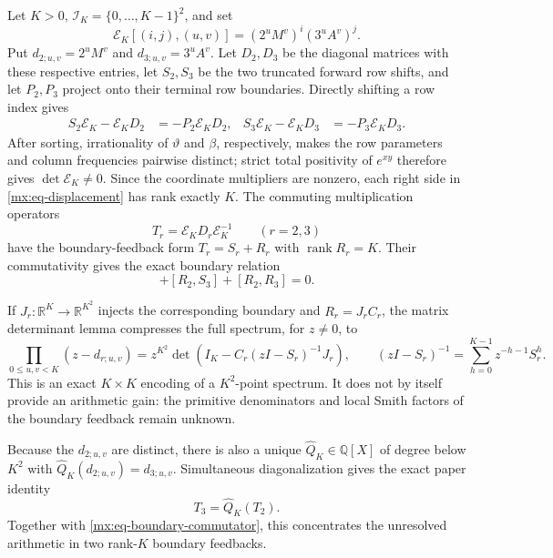 \documentclass[11pt,oneside]{article}
\theoremstyle{definition}
\theoremstyle{remark}
\newcommand{\Q}{\mathbb Q}
\newcommand{\R}{\mathbb R}
\newcommand{\thetaq}{\vartheta}
\begin{document}
Let $K>0$, $\mathcal I_K=\{0,\ldots,K-1\}^2$, and set
\begin{equation}
 \mathcal E_K[(i,j),(u,v)]
 =(2^uM^v)^i(3^uA^v)^j.
 \label{mx:eq-grid-matrix}
\end{equation}
Put $d_{2;u,v}=2^uM^v$ and $d_{3;u,v}=3^uA^v$.  Let $D_2,D_3$ be the diagonal matrices
with these respective entries, let
$S_2,S_3$ be the two truncated forward row shifts, and let $P_2,P_3$ project onto their
terminal row boundaries.  Directly shifting a row index gives
\begin{align}
 S_2\mathcal E_K-\mathcal E_KD_2&=-P_2\mathcal E_KD_2,
 &S_3\mathcal E_K-\mathcal E_KD_3&=-P_3\mathcal E_KD_3.
 \label{mx:eq-displacement}
\end{align}
After sorting, irrationality of $\thetaq$ and $\beta$, respectively, makes the row parameters
and column frequencies pairwise distinct; strict total positivity of $e^{xy}$ therefore gives
$\det\mathcal E_K\ne0$.  Since the coordinate multipliers are nonzero, each right side in
\eqref{mx:eq-displacement} has rank exactly $K$.  The commuting
multiplication operators
\[
 T_r=\mathcal E_KD_r\mathcal E_K^{-1}\qquad(r=2,3)
\]
have the boundary-feedback form $T_r=S_r+R_r$ with $\operatorname{rank}R_r=K$.  Their commutativity gives
the exact boundary relation
\begin{equation}
 [S_2,R_3]+[R_2,S_3]+[R_2,R_3]=0.
 \label{mx:eq-boundary-commutator}
\end{equation}

If $J_r:\R^K\to\R^{K^2}$ injects the corresponding boundary and $R_r=J_rC_r$, the matrix
determinant lemma compresses the full spectrum, for $z\ne0$, to
\begin{equation}
 \prod_{0\le u,v<K}(z-d_{r;u,v})
 =z^{K^2}\det\!\left(I_K-C_r(zI-S_r)^{-1}J_r\right),
 \qquad
 (zI-S_r)^{-1}=\sum_{h=0}^{K-1}z^{-h-1}S_r^h.
 \label{mx:eq-transfer-determinant}
\end{equation}
This is an exact $K\times K$ encoding of a $K^2$-point spectrum.  It does not by itself
provide an arithmetic gain: the primitive denominators and local Smith factors of the
boundary feedback remain unknown.

Because the $d_{2;u,v}$ are distinct, there is also a unique
$\widehat Q_K\in\Q[X]$ of degree below $K^2$ with
$\widehat Q_K(d_{2;u,v})=d_{3;u,v}$.  Simultaneous diagonalization gives the exact paper
identity
\begin{equation}
 T_3=\widehat Q_K(T_2).
 \label{mx:eq-spectral-interpolation}
\end{equation}
Together with \eqref{mx:eq-boundary-commutator}, this concentrates the unresolved arithmetic
in two rank-$K$ boundary feedbacks.
\end{document}
